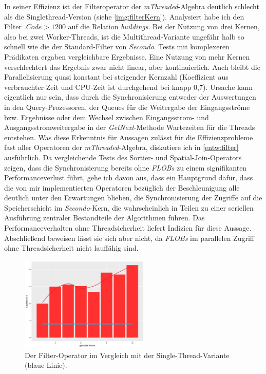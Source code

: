 \documentclass[a4paper,12pt,twoside]{article}
\newcommand{\Fb}[1]{\textit{#1}} %
\begin{document}
In seiner Effizienz ist der Filteroperator der \Fb{mThreaded}-Algebra deutlich schlecht als die Singlethread-Version (siehe \autoref{img:filterKern}). Analysiert habe ich den Filter $.Code > 1200$ auf die Relation \Fb{buildings}. Bei der Nutzung von drei Kernen, also bei zwei Worker-Threads, ist die Multithread-Variante ungefähr halb so schnell wie die der Standard-Filter von \Fb{Secondo}. Tests mit komplexeren Prädikaten ergaben vergleichbare Ergebnisse. Eine Nutzung von mehr Kernen verschlechtert das Ergebnis zwar nicht linear, aber kontinuierlich. Auch bleibt die Parallelisierung quasi konstant bei steigender Kernzahl (Koeffizient aus verbrauchter Zeit und CPU-Zeit ist durchgehend bei knapp 0,7). Ursache kann eigentlich nur sein, dass durch die Synchronisierung entweder der Auswertungen in den Query-Prozessoren, der Queues für die Weitergabe der Eingangsströme bzw. Ergebnisse oder dem Wechsel zwischen Eingangsstrom- und Ausgangsstromweitergabe in der \Fb{\Fb{GetNext}}-Methode Wartezeiten für die Threads entstehen. Was diese Erkenntnis für Aussagen zulässt für die Effizienzprobleme fast aller Operatoren der \Fb{mThreaded}-Algebra, diskutiere ich in \autoref{entw:filter} ausführlich. Da vergleichende Tests des Sortier- und Spatial-Join-Operators zeigen, dass die Synchronisierung bereits ohne \Fb{FLOBs} zu einem signifikanten Performanceverlust führt, gehe ich davon aus, dass ein Hauptgrund dafür, dass die von mir implementierten Operatoren bezüglich der Beschleunigung alle deutlich unter den Erwartungen blieben, die Synchronisierung der Zugriffe auf die Speicherschicht im \Fb{Secondo}-Kern, die wahrscheinlich in Teilen zu einer seriellen Ausführung zentraler Bestandteile der Algorithmen führen. Das Performanceverhalten ohne Threadsicherheit liefert Indizien für diese Aussage. Abschließend beweisen lässt sie sich aber nicht, da \Fb{FLOBs} im parallelen Zugriff ohne Threadsicherheit nicht lauffähig sind.  

\begin{figure}
	\centering
	\includegraphics[width=0.55\textwidth]{Bilder/filter_kerne.png}
	\caption{Der Filter-Operator im Vergleich mit der Single-Thread-Variante (blaue Linie).}
	\label{img:filterKern}
\end{figure}
\end{document}
